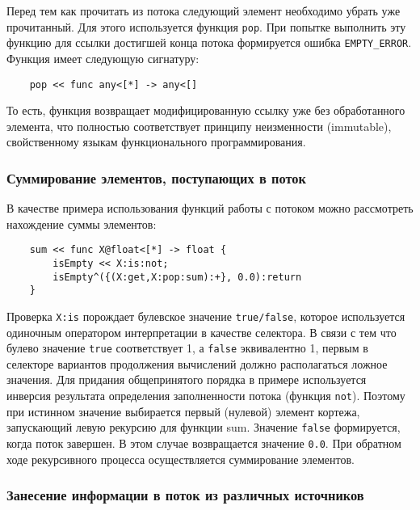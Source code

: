 Перед тем как прочитать из потока следующий элемент необходимо убрать уже прочитанный. Для этого используется функция \texttt{pop}.
При попытке выполнить эту функцию для ссылки достигшей конца потока формируется ошибка  \verb|EMPTY_ERROR|. Функция имеет следующую сигнатуру:
\begin{verbatim}
    pop << func any<[*] -> any<[]
\end{verbatim}
То есть, функция возвращает модифицированную ссылку уже без обработанного элемента, что полностью соответствует принципу неизменности (immutable), свойственному языкам функционального программирования.

\subsubsection{Суммирование элементов, поступающих в поток}

В качестве примера использования функций работы с потоком можно рассмотреть нахождение суммы элементов:

\begin{verbatim}
    sum << func X@float<[*] -> float {
        isEmpty << X:is:not;
        isEmpty^({(X:get,X:pop:sum):+}, 0.0):return
    }
\end{verbatim}
Проверка \texttt{X:is} порождает булевское значение \texttt{true/false}, которое используется одиночным оператором интерпретации в качестве селектора. В связи с тем что булево значение \verb|true| соответствует 1, а \verb|false| эквивалентно 1, первым в селекторе вариантов продолжения вычислений должно располагаться ложное значения. Для придания общепринятого порядка в примере используется инверсия результата определения заполненности потока (функция \verb|not|). Поэтому при истинном значение выбирается первый (нулевой) элемент кортежа, запускающий левую рекурсию для функции sum. Значение \texttt{false} формируется, когда поток завершен. В этом случае возвращается значение \texttt{0.0}. При обратном ходе рекурсивного процесса осуществляется суммирование элементов.

\subsubsection{Занесение информации в поток из различных источников}

